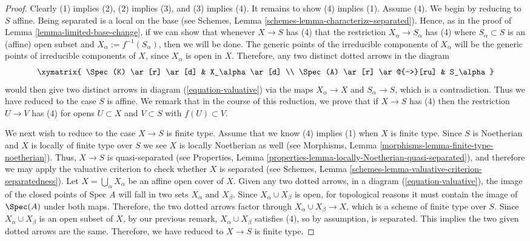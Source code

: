 \begin{proof}
Clearly (1) implies (2), (2) implies (3), and (3) implies (4).  It
remains to show (4) implies (1). Assume (4).
We begin by reducing to $S$ affine.  Being separated is a local
on the base (see
Schemes, Lemma \ref{schemes-lemma-characterize-separated}).
Hence, as in the proof of Lemma
\ref{lemma-limited-base-change}, if we can show that whenever
$X \to S$ has (4) that the restriction $X_\alpha \to S_\alpha$ has (4)
where $S_\alpha \subset S$ is an (affine) open subset and $X_\alpha :=
f^{-1}(S_\alpha)$, then we will be done.  The
generic points of the irreducible components of $X_\alpha$ will be the
generic points of irreducible components of $X$, since $X_\alpha$ is
open in $X$.  Therefore, any two distinct dotted arrows in the diagram
\begin{equation}
\label{equation-valuative-alpha}
\xymatrix{
\Spec(K) \ar[r] \ar[d] & X_\alpha \ar[d] \\
\Spec(A) \ar[r] \ar@{-->}[ru] & S_\alpha
}
\end{equation}
would then give two distinct arrows in diagram
(\ref{equation-valuative}) via the maps $X_\alpha \to X$ and
$S_\alpha \to S$, which is a contradiction.  Thus we have reduced
to the case $S$ is affine.  We remark that in the course of this
reduction, we prove that if $X \to S$ has (4) then the restriction $U
\to V$ has (4) for opens $U \subset X$ and $V \subset S$ with
$f(U) \subset V$.

\medskip\noindent
We next wish to reduce to the case $X \to S$ is finite type.  Assume
that we know (4) implies (1) when $X$ is finite type. Since
$S$ is Noetherian and $X$ is locally of finite type over $S$
we see $X$ is locally Noetherian as well (see Morphisms,
Lemma \ref{morphisms-lemma-finite-type-noetherian}).
Thus, $X \to S$ is quasi-separated (see
Properties, Lemma \ref{properties-lemma-locally-Noetherian-quasi-separated}),
and therefore we may apply the valuative criterion to check whether $X$
is separated (see
Schemes, Lemma \ref{schemes-lemma-valuative-criterion-separatedness}).
Let $X = \bigcup_\alpha X_\alpha$ be an affine open
cover of $X$. Given any two dotted arrows, in a diagram
(\ref{equation-valuative}), the image of the closed points of
$\text{Spec } A$ will
fall in two sets $X_\alpha$ and $X_\beta$.  Since $X_\alpha \cup
X_\beta$ is open, for topological reasons it must contain the image of
$\Spec(A)$ under both maps. Therefore, the two dotted arrows factor
through $X_\alpha \cup X_\beta \to X$, which is a scheme of finite type over
$S$. Since $X_\alpha \cup X_\beta$ is an open subset of $X$, by our
previous remark, $X_\alpha \cup X_\beta$ satisfies (4), so by
assumption, is separated.  This implies the two given dotted
arrows are the same. Therefore, we have reduced to $X \to S$ is finite type.


\end{proof}
